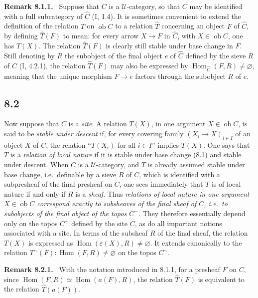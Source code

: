 \documentclass[11pt]{article}
\newcommand{\U}{\mathcal{U}}
\newcommand{\Hom}{\operatorname{Hom}}
\newcommand{\ie}{i.e.}
\newenvironment{remarktext}[1]{\par\medskip\noindent\textbf{#1.}\ }{\par\medskip}
\providecommand{\ob}{\operatorname{ob}}
\begin{document}
\begin{remarktext}{Remark 8.1.1}
Suppose that \(C\) is a \(\U\)-category, so that \(C\) may be identified with a full subcategory of \(\widehat C\) (I, 1.4). It is sometimes convenient to extend the definition of the relation \(T\) on \(\ob C\) to a relation \(\widehat T\) concerning an object \(F\) of \(\widehat C\), by defining \(\widehat T(F)\) to mean: for every arrow \(X\to F\) in \(\widehat C\), with \(X\in\ob C\), one has \(T(X)\). The relation \(\widehat T(F)\) is clearly still stable under base change in \(F\). Still denoting by \(R\) the subobject of the final object \(e\) of \(\widehat C\) defined by the sieve \(R\) of \(C\) (I, 4.2.1), the relation \(\widehat T(F)\) may also be expressed by \(\Hom_{\widehat C}(F,R)\ne\varnothing\), meaning that the unique morphism \(F\to e\) factors through the subobject \(R\) of \(e\).
\end{remarktext}

\subsection*{8.2}
Now suppose that \(C\) is a \emph{site}. A relation \(T(X)\), in one argument \(X\in\ob C\), is said to be \emph{stable under descent} if, for every covering family \((X_i\to X)_{i\in I}\) of an object \(X\) of \(C\), the relation ``\(T(X_i)\) for all \(i\in I\)'' implies \(T(X)\). One says that \(T\) is a \emph{relation of local nature} if it is stable under base change (8.1) and stable under descent. When \(C\) is a \(\U\)-category, and \(T\) is already assumed stable under base change, \ie\ definable by a sieve \(R\) of \(C\), which is identified with a subpresheaf of the final presheaf on \(C\), one sees immediately that \(T\) is of local nature if and only if \(R\) is a \emph{sheaf}. Thus \emph{relations of local nature in one argument \(X\in\ob C\) correspond exactly to subsheaves of the final sheaf of \(C\), \ie\ to subobjects of the final object of the topos \(C^{\sim}\).} They therefore essentially depend only on the topos \(C^{\sim}\) defined by the site \(C\), as do all important notions associated with a site. In terms of the subsheaf \(R\) of the final sheaf, the relation \(T(X)\) is expressed as \(\Hom(\varepsilon(X),R)\ne\varnothing\). It extends canonically to the relation \(T^{\sim}(F):\Hom(F,R)\ne\varnothing\) on the topos \(C^{\sim}\).

\begin{remarktext}{Remark 8.2.1}
With the notation introduced in 8.1.1, for a presheaf \(F\) on \(C\), since \(\Hom(F,R)\simeq\Hom(a(F),R)\), the relation \(\widehat T(F)\) is equivalent to the relation \(\widehat T(a(F))\).
\end{remarktext}
\end{document}

